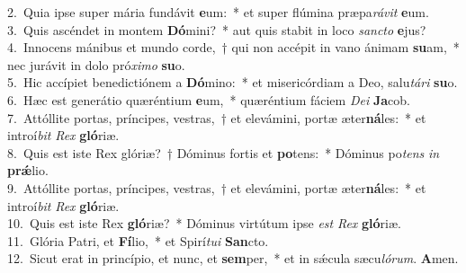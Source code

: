 {2.~}Quia ipse super mária fundávit \textbf{e}um:~* et super flúmina præpa\textit{rá}\textit{vit} \textbf{e}um.\\
{3.~}Quis ascéndet in montem \textbf{Dó}mini?~* aut quis stabit in loco \textit{san}\textit{cto} \textbf{e}jus?\\
{4.~}Innocens mánibus et mundo corde,~† qui non accépit in vano ánimam \textbf{su}am,~* nec jurávit in dolo pró\textit{xi}\textit{mo} \textbf{su}o.\\
{5.~}Hic accípiet benedictiónem a \textbf{Dó}mino:~* et misericórdiam a Deo, salu\textit{tá}\textit{ri} \textbf{su}o.\\
{6.~}Hæc est generátio quæréntium \textbf{e}um,~* quæréntium fáciem \textit{De}\textit{i} \textbf{Ja}cob.\\
{7.~}Attóllite portas, príncipes, vestras,~† et elevámini, portæ æter\textbf{ná}les:~* et introí\textit{bit} \textit{Rex} \textbf{gló}riæ.\\
{8.~}Quis est iste Rex glóriæ?~† Dóminus fortis et \textbf{po}tens:~* Dóminus po\textit{tens} \textit{in} \textbf{prǽ}lio.\\
{9.~}Attóllite portas, príncipes, vestras,~† et elevámini, portæ æter\textbf{ná}les:~* et introí\textit{bit} \textit{Rex} \textbf{gló}riæ.\\
{10.~}Quis est iste Rex \textbf{gló}riæ?~* Dóminus virtútum ipse \textit{est} \textit{Rex} \textbf{gló}riæ.\\
{11.~}Glória Patri, et \textbf{Fí}lio,~* et Spirí\textit{tu}\textit{i} \textbf{San}cto.\\
{12.~}Sicut erat in princípio, et nunc, et \textbf{sem}per,~* et in sǽcula sæcu\textit{ló}\textit{rum}. \textbf{A}men.\\
